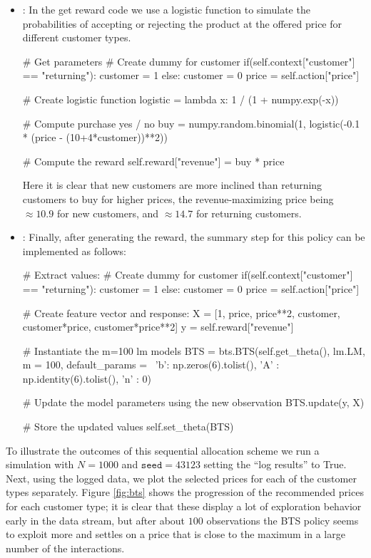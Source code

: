 \documentclass[nojss]{jss}
\begin{document}
\begin{itemize}
\item {}: In the get reward code we use a logistic function to simulate the probabilities of accepting or rejecting the product at the offered price for different customer types.
\begin{Code}
# Get parameters
# Create dummy for customer
if(self.context["customer"] == "returning"):
    customer = 1
else:
    customer = 0
price = self.action["price"]

# Create logistic function
logistic = lambda x: 1 / (1 + numpy.exp(-x))

# Compute purchase yes / no
buy = numpy.random.binomial(1, logistic(-0.1 * (price - (10+4*customer))**2))

# Compute the reward
self.reward["revenue"] = buy * price
\end{Code}
Here it is clear that new customers are more inclined than returning customers to buy for higher prices, the revenue-maximizing price being $\approx 10.9$ for new customers, and $\approx 14.7$ for returning customers.

\item {}: Finally, after generating the reward, the summary step for this policy can be implemented as follows:
\begin{Code}
# Extract values:
# Create dummy for customer
if(self.context["customer"] == "returning"):
    customer = 1
else:
    customer = 0
price = self.action["price"]

# Create feature vector and response:
X = [1, price, price**2, customer, customer*price, customer*price**2]
y = self.reward["revenue"]

# Instantiate the m=100 lm models
BTS = bts.BTS(self.get_theta(), lm.LM, m = 100, default_params = \
       {'b': np.zeros(6).tolist(), 'A' : np.identity(6).tolist(), 'n' : 0})

# Update the model parameters using the new observation
BTS.update(y, X)

# Store the updated values
self.set_theta(BTS)
\end{Code}
\end{itemize}

To illustrate the outcomes of this sequential allocation scheme we run a simulation with $N=1000$ and $\texttt{seed}=43123$ setting the ``log results'' to True. Next, using the logged data, we plot the selected prices for each of the customer types separately. Figure \ref{fig:bts} shows the progression of the recommended prices for each customer type; it is clear that these display a lot of exploration behavior early in the data stream, but after about $100$ observations the BTS policy seems to exploit more and settles on a price that is close to the maximum in a large number of the interactions.
\end{document}
